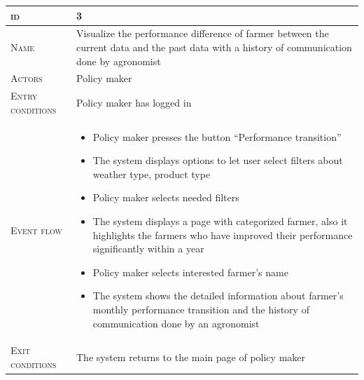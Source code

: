 \begin{table}[H]
    \centering
    \begin{tabular}{|l|p{}|}
        \hline %
    	\textsc{id}                 &   3\\
    	\hline %
    	\textsc{Name}               &   Visualize the performance difference of farmer between the current data and the past data with a history of communication done 
    	by agronomist\\
    	\hline %
    	\textsc{Actors}             &   Policy maker\\
    	\hline %
    	\textsc{Entry conditions}   &   Policy maker has logged in\\
    	\hline %
    	\textsc{Event flow}         &   %
            	                        \begin{itemize}
                                    	    \item Policy maker presses the button “Performance transition”
                                    	    \item The system displays options to let user select filters about weather type, product type
                                    		\item Policy maker selects needed filters
                                    		\item The system displays a page with categorized farmer, also it highlights the farmers who have improved their performance significantly within a year
                                    		\item Policy maker selects interested farmer’s name
                                    		\item The system shows the detailed information about farmer’s monthly performance transition and the history of communication done by an agronomist 
                                        \end{itemize}\\
        \hline %
        \textsc{Exit conditions}    &  The system returns to the main page of policy maker\\

\end{tabular}
\end{table}
